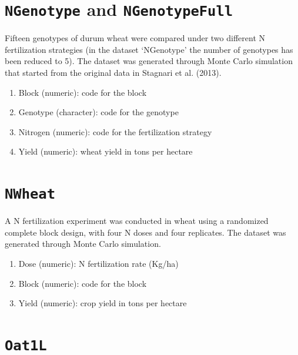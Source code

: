 \documentclass[
  letterpaper,
  DIV=11,
  numbers=noendperiod]{scrreprt}
\providecommand{\tightlist}{%
  \setlength{\itemsep}{0pt}\setlength{\parskip}{0pt}}
\begin{document}
\section*{\texorpdfstring{\texttt{NGenotype} and
\texttt{NGenotypeFull}}{NGenotype and NGenotypeFull}}\label{ngenotype-and-ngenotypefull}


Fifteen genotypes of durum wheat were compared under two different N
fertilization strategies (in the dataset `NGenotype' the number of
genotypes has been reduced to 5). The dataset was generated through
Monte Carlo simulation that started from the original data in Stagnari
et al. (2013).

\begin{enumerate}
\def\labelenumi{\arabic{enumi}.}
\tightlist
\item
  Block (numeric): code for the block
\item
  Genotype (character): code for the genotype
\item
  Nitrogen (numeric): code for the fertilization strategy
\item
  Yield (numeric): wheat yield in tons per hectare
\end{enumerate}

\section*{\texorpdfstring{\texttt{NWheat}}{NWheat}}\label{nwheat}


A N fertilization experiment was conducted in wheat using a randomized
complete block design, with four N doses and four replicates. The
dataset was generated through Monte Carlo simulation.

\begin{enumerate}
\def\labelenumi{\arabic{enumi}.}
\tightlist
\item
  Dose (numeric): N fertilization rate (Kg/ha)
\item
  Block (numeric): code for the block
\item
  Yield (numeric): crop yield in tons per hectare
\end{enumerate}

\section*{\texorpdfstring{\texttt{Oat1L}}{Oat1L}}\label{oat1l}
\end{document}
